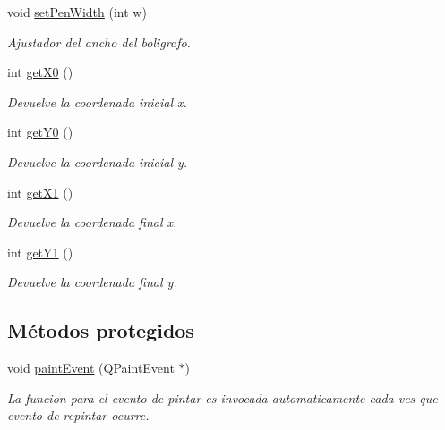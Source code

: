 \begin{DoxyCompactItemize}
void \hyperlink{class_line_a346d88820371b5a4710eed8a638fc451}{set\+Pen\+Width} (int w)
\begin{DoxyCompactList}\small\item\em Ajustador del ancho del boligrafo. \end{DoxyCompactList}\item 
int \hyperlink{class_line_a0e23ee7edc154bd73fefab4d88cae150}{get\+X0} ()
\begin{DoxyCompactList}\small\item\em Devuelve la coordenada inicial x. \end{DoxyCompactList}\item 
int \hyperlink{class_line_a971146fd8bbf711123f03e45daf923c9}{get\+Y0} ()
\begin{DoxyCompactList}\small\item\em Devuelve la coordenada inicial y. \end{DoxyCompactList}\item 
int \hyperlink{class_line_a1f51d8df03219f5f63d656bc0e9b2830}{get\+X1} ()
\begin{DoxyCompactList}\small\item\em Devuelve la coordenada final x. \end{DoxyCompactList}\item 
int \hyperlink{class_line_a9cc398fdcf93212a3e4db28ac26a88a9}{get\+Y1} ()
\begin{DoxyCompactList}\small\item\em Devuelve la coordenada final y. \end{DoxyCompactList}\end{DoxyCompactItemize}
\subsection*{Métodos protegidos}
\begin{DoxyCompactItemize}
\item 
\hypertarget{class_line_a7e1f30fa9d7375fd67a2b4cf5a1b6a76}{}void \hyperlink{class_line_a7e1f30fa9d7375fd67a2b4cf5a1b6a76}{paint\+Event} (Q\+Paint\+Event $\ast$)\label{class_line_a7e1f30fa9d7375fd67a2b4cf5a1b6a76}

\begin{DoxyCompactList}\small\item\em La funcion para el evento de pintar es invocada automaticamente cada ves que evento de repintar ocurre. \end{DoxyCompactList}\end{DoxyCompactItemize}
